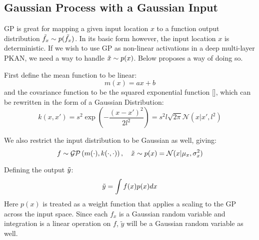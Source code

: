 \documentclass{article}
\begin{document}
\subsection{Gaussian Process with a Gaussian Input}
GP is great for mapping a given input location $x$ to a function output distribution $\Tilde{f_x}\sim p(\Tilde{f_x})$. In its basic form however, the input location $x$ is deterministic. If we wish to use GP as non-linear activations in a deep multi-layer PKAN, we need a way to handle $\Tilde{x}\sim p(x)$. Below proposes a way of doing so.

First define the mean function to be linear:
\begin{equation}
    m(x) = ax+b
    \label{eq:mean_linear}
\end{equation}
and the covariance function to be the squared exponential function [\cite[p.83]{Gaussian-Processes-for-Machine-Learning}], which can be rewritten in the form of a Gaussian Distribution:
\begin{equation}
    k(x,x')=s^2\exp\left(-\frac{(x-x')^2}{2l^2}\right)=s^2l\sqrt{2\pi}\mathcal{N}(x|x',l^2)
    \label{eq:covar_se}
\end{equation}

We also restrict the input distribution to be Gaussian as well, giving:
\begin{equation}
    f\sim\mathcal{GP}\left(m(\cdot), k(\cdot, \cdot)\right),\quad \Tilde{x}\sim p(x)=\mathcal{N}(x|\mu_x,\sigma_x^2)
\end{equation}

Defining the output $\Tilde{y}$:
\begin{equation}
    \Tilde{y}=\int f(x)p(x)dx
\end{equation}
Here $p(x)$ is treated as a weight function that applies a scaling to the GP across the input space. Since each $f_x$ is a Gaussian random variable and integration is a linear operation on $f$, $\tilde{y}$ will be a Gaussian random variable as well.
\end{document}
